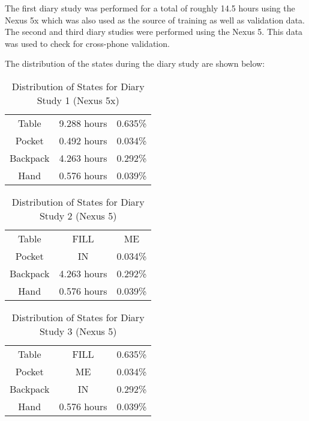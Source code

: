 The first diary study was performed for a total of roughly 14.5 hours using the Nexus 5x which was also used as the source of training as well as validation data.
The second and third diary studies were performed using the Nexus 5.
This data was used to check for cross-phone validation.


The distribution of the states during the diary study are shown below:


\begin{table}[h]
\caption{Distribution of States for Diary Study 1 (Nexus 5x)}\label{tab:diary1} \centering
\begin{tabular}{ |c|c|c| } 
 \hline
 Table & 9.288 hours & 0.635\%  \\ 
 Pocket & 0.492 hours & 0.034\% \\ 
 Backpack &  4.263 hours  &  0.292\% \\ 
 Hand & 0.576 hours  & 0.039\% \\
 \hline
\end{tabular}
\end{table}

\begin{table}[h]
\caption{Distribution of States for Diary Study 2 (Nexus 5)}\label{tab:diary1} \centering
\begin{tabular}{ |c|c|c| } 
 \hline
 Table & FILL & ME  \\ 
 Pocket & IN & 0.034\% \\ 
 Backpack &  4.263 hours  &  0.292\% \\ 
 Hand & 0.576 hours  & 0.039\% \\
 \hline
\end{tabular}
\end{table}

\begin{table}[h]
\caption{Distribution of States for Diary Study 3 (Nexus 5)}\label{tab:diary1} \centering
\begin{tabular}{ |c|c|c| } 
 \hline
 Table & FILL & 0.635\%  \\ 
 Pocket & ME & 0.034\% \\ 
 Backpack &  IN  &  0.292\% \\ 
 Hand & 0.576 hours  & 0.039\% \\
 \hline
\end{tabular}
\end{table}


